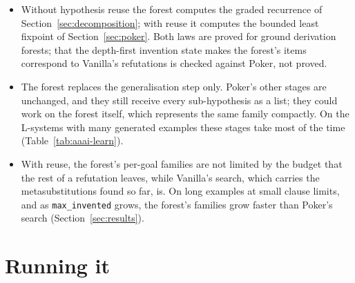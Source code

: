 \documentclass[11pt]{article}
\begin{document}
\begin{itemize}
\item Without hypothesis reuse the forest computes the graded recurrence of
  Section~\ref{sec:decomposition}; with reuse it computes the bounded least fixpoint
  of Section~\ref{sec:poker}. Both laws are proved for ground derivation forests;
  that the depth-first invention state makes the forest's items correspond to
  Vanilla's refutations is checked against Poker, not proved.
\item The forest replaces the generalisation step only. Poker's other stages are
  unchanged, and they still receive every sub-hypothesis as a list; they could work
  on the forest itself, which represents the same family compactly. On the
  L-systems with many generated examples these stages take most of the time
  (Table~\ref{tab:aaai-learn}).
\item With reuse, the forest's per-goal families are not limited by the budget that
  the rest of a refutation leaves, while Vanilla's search, which carries the
  metasubstitutions found so far, is. On long examples at small clause limits, and
  as \texttt{max\_invented} grows, the forest's families grow faster than Poker's
  search (Section~\ref{sec:results}).
\end{itemize}

\section{Running it}
\end{document}
